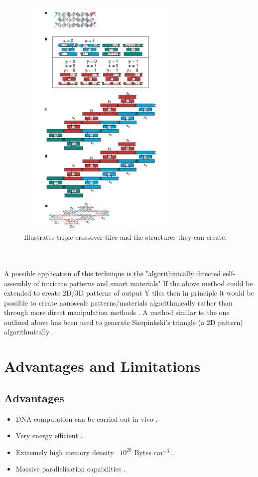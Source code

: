 \documentclass[11pt,a4paper,portrait]{article}
\begin{document}
\begin{figure}[ht!]
\centering
\includegraphics[width=80mm, height=120mm]{dnatiles.png}
\caption{Illustrates triple crossover tiles and the structures they can create. \cite{Tiles00}  \label{dnatiles}}
\end{figure}
\\
\\
A possible application of this technique is the "algorithmically directed self-assembly of intricate patterns and smart materials" \cite{Tiles00} If the above method could be extended to create 2D/3D patterns of output Y tiles then in principle it would be possible to create nanoscale patterns/materials algorithmically rather than through more direct manipulation methods \cite{Tiles00}. A method similar to the one outlined above has been used to generate Sierpinkski's triangle (a 2D pattern) algorithmically \cite{Sierpinski}.

\clearpage
\section{Advantages and Limitations}
\subsection{Advantages}
\begin{itemize}
\item DNA computation can be carried out in vivo \cite{Qian11}.
\item Very energy efficient \cite{Adleman1994}\cite{Ezziane06}.
\item Extremely high memory density ~$10^{20}$ Bytes $cm^{-3}$ \cite{Adleman1994}\cite{Ezziane06}.
\item Massive parallelisation capabilities \cite{Adleman1994}\cite{Ezziane06}.
\end{itemize}
\end{document}
